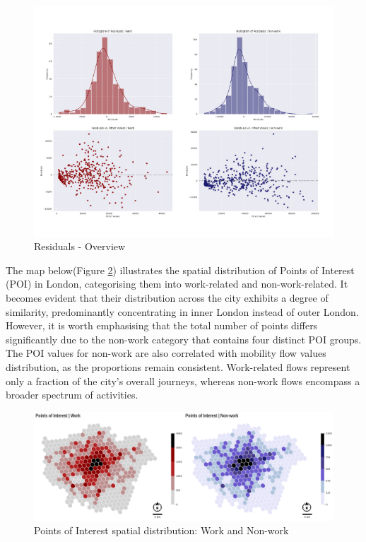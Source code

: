         \begin{figure}[H]
            \centering
            \includegraphics[width=14cm]{Images/Residuals_overview.png}
            \caption{Residuals - Overview}
            \label{fig: Residuals - Overview}
        \end{figure}
        
 

        The map below(Figure \ref{fig: POI_map}) illustrates the spatial distribution of Points of Interest (POI) in London, categorising them into work-related and non-work-related. It becomes evident that their distribution across the city exhibits a degree of similarity, predominantly concentrating in inner London instead of outer London. However, it is worth emphasising that the total number of points differs significantly due to the non-work category that contains four distinct POI groups. The POI values for non-work are also correlated with mobility flow values distribution, as the proportions remain consistent. Work-related flows represent only a fraction of the city's overall journeys, whereas non-work flows encompass a broader spectrum of activities.

        \begin{figure}[H]
            \centering
            \includegraphics[width=14cm]{Images/POI_map.png}
            \caption{Points of Interest spatial distribution: Work and Non-work}
            \label{fig: POI_map}
        \end{figure}

